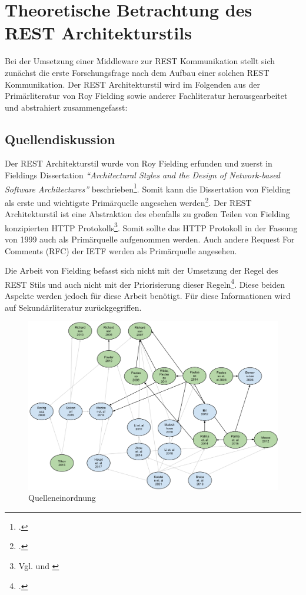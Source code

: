 \chapter{Theoretische Betrachtung des REST Architekturstils}\label{chapter:theoretische-betrachtung}

Bei der Umsetzung einer Middleware zur REST Kommunikation stellt sich zunächst die erste Forschungsfrage nach dem Aufbau einer solchen REST Kommunikation. Der REST Architekturstil wird im Folgenden aus der Primärliteratur von Roy Fielding sowie anderer Fachliteratur herausgearbeitet und abstrahiert zusammengefasst:

\section{Quellendiskussion}\label{section:quellendiskussion}

Der REST Architekturstil wurde von Roy Fielding erfunden und zuerst in Fieldings Dissertation \emph{“Architectural Styles and the Design of Network-based Software Architectures”} beschrieben\footcite[Vgl. ][S. 1]{tilkov_rest_2015}. Somit kann die Dissertation von Fielding als erste und wichtigste Primärquelle angesehen werden\footcite[Vgl. ][S. XVI]{richardson_restful_2007}. Der REST Architekturstil ist eine Abstraktion des ebenfalls zu großen Teilen von Fielding konzipierten HTTP Protokolls\footnote{Vgl. \cite[S. 1]{tilkov_rest_2015} und \cite[S. XVII]{richardson_restful_2007}}. Somit sollte das HTTP Protokoll in der Fassung von 1999 auch als Primärquelle aufgenommen werden. Auch andere Request For Comments (RFC) der IETF werden als Primärquelle angesehen. 

Die Arbeit von Fielding befasst sich nicht mit der Umsetzung der Regel des REST Stils und auch nicht mit der Priorisierung dieser Regeln\footcite[Vgl. ][S. XVI]{richardson_restful_2007}. Diese beiden Aspekte werden jedoch für diese Arbeit benötigt. Für diese Informationen wird auf Sekundärliteratur zurückgegriffen. 

\begin{figure}[htb]
\centering
\includegraphics[width=\textwidth]{graphics/quelleneinordnung.png}
\caption[quelleneinordnung]{Quelleneinordnung}
\label{abb:QuellenEinordnung}
\end{figure}


